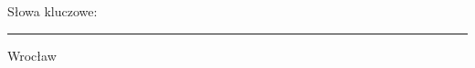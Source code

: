 {\begin{titlepage}
    \vspace*{\fill}
    
    {\raggedright
      \small Słowa kluczowe: \textit{\stSlowaKluczowe}\par
      \vspace{0.5em}
      \par\noindent\rule{\textwidth}{1pt}\par 
    }
    
    \begin{center}
      \Large Wrocław \stRok
    \end{center}
  
    \restoregeometry
  \end{titlepage}
  \normalfont
  \pagestyle{empty}
}

\newenvironment{abstracts}{}{\selectlanguage{polish}\clearpage}

\newcommand{\AbstractPL}{
  \begin{center}{\Large\bfseries Streszczenie \par}\end{center}\vspace{0.5em}
}

\newcommand{\AbstractENG}{
  \selectlanguage{english}
  \begin{center}{\Large\bfseries Abstract \par}\end{center}\vspace{0.5em}
}

\newcommand{\SpisTresci}{
  \clearpage
  \addtocontents{toc}{\protect\thispagestyle{empty}} 
  \pagestyle{empty} 
  \tableofcontents
  \clearpage
  \pagestyle{empty}
}

\newcommand{\SetMetaData}{%
  \AtBeginDocument{%
    \hypersetup{%
      pdfinfo = {%
        Title    = {\stTytulPL},
        Author   = {\stAutor},
        Subject  = {Praca dyplomowa \stRodzajPracy},  
        Keywords = {\stSlowaKluczowe}, 
        ModDate  = {\pdfcreationdate}, 
        Creator  = {pdftex}
      }
    }
  }
}
